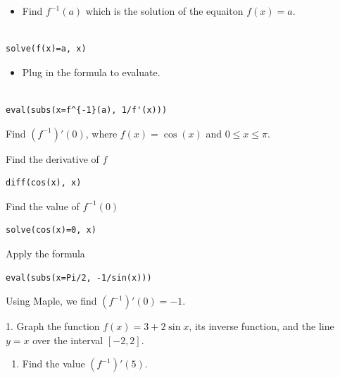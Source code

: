 \documentclass[]{book}
\providecommand{\tightlist}{%
  \setlength{\itemsep}{0pt}\setlength{\parskip}{0pt}}
\theoremstyle{definition}
\theoremstyle{definition}
\theoremstyle{definition}
\theoremstyle{remark}
\let\BeginKnitrBlock\begin \let\EndKnitrBlock\end
\begin{document}
\begin{itemize}
\tightlist
\item
  Find \(f^{-1}(a)\) which is the solution of the equaiton \(f(x)=a\).
\end{itemize}

\begin{verbatim}

solve(f(x)=a, x)
\end{verbatim}

\begin{itemize}
\tightlist
\item
  Plug in the formula to evaluate.
\end{itemize}

\begin{verbatim}

eval(subs(x=f^{-1}(a), 1/f'(x)))
\end{verbatim}

\BeginKnitrBlock{example}
\protect\hypertarget{exm:unnamed-chunk-3}{}{\label{exm:unnamed-chunk-3} }Find \((f^{-1})'(0)\), where \(f(x)=\cos(x)\) and \(0\leq x\leq \pi\).
\EndKnitrBlock{example}

\BeginKnitrBlock{solution}
{}
Find the derivative of \(f\)

\begin{verbatim}
diff(cos(x), x)
\end{verbatim}

Find the value of \(f^{-1}(0)\)

\begin{verbatim}
solve(cos(x)=0, x)
\end{verbatim}

Apply the formula

\begin{verbatim}
eval(subs(x=Pi/2, -1/sin(x)))
\end{verbatim}

Using Maple, we find \((f^{-1})'(0)=-1\).
\EndKnitrBlock{solution}

\BeginKnitrBlock{exercise}
\protect\hypertarget{exr:unnamed-chunk-5}{}{\label{exr:unnamed-chunk-5} }
1. Graph the function \(f(x)=3+2\sin x\), its inverse function, and the line \(y=x\) over the interval \([-2,2]\).

\begin{enumerate}
\def\labelenumi{\arabic{enumi}.}
\setcounter{enumi}{1}
\tightlist
\item
  Find the value \((f^{-1})'(5)\).
\end{enumerate}
\EndKnitrBlock{exercise}
\end{document}
